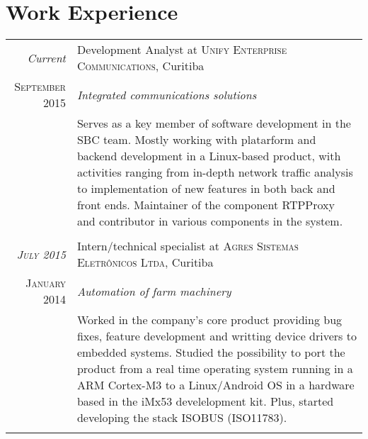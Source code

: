 \documentclass[a4paper,10pt]{article}
\begin{document}
\section{Work Experience}
    \begin{tabular}{r|p{11cm}}
        \emph{Current}               & Development Analyst at \textsc
                                     {Unify Enterprise Communications},
                                     Curitiba \\

        \textsc{September 2015}      &\emph
                                     {Integrated communications solutions} \\
                                     &\footnotesize
                                     {
                                         Serves as a key member of software
                                         development in the SBC team. Mostly
                                         working with platarform and backend
                                         development in a Linux-based product,
                                         with activities ranging from in-depth
                                         network traffic analysis to
                                         implementation of new features in both
                                         back and front ends. Maintainer of the
                                         component RTPProxy and contributor in
                                         various components in the system.
                                     } \\
                                     \multicolumn{2}{c}{} \\

        \emph{\textsc{July 2015}}    & Intern/technical specialist at \textsc
                                     {Agres Sistemas Eletrônicos Ltda},
                                     Curitiba \\

        \textsc{January 2014}        &\emph
                                     {Automation of farm machinery} \\
                                     &\footnotesize
                                     {
                                         Worked in the company's core product
                                         providing bug fixes, feature
                                         development and writting device drivers
                                         to embedded systems. Studied the
                                         possibility to port the product from a
                                         real time operating system running in
                                         a ARM Cortex-M3 to a Linux/Android OS
                                         in a hardware based in the iMx53
                                         develelopment kit. Plus, started
                                         developing the stack ISOBUS (ISO11783).
                                     } \\
                                     \multicolumn{2}{c}{} \\


\end{tabular}
\end{document}
